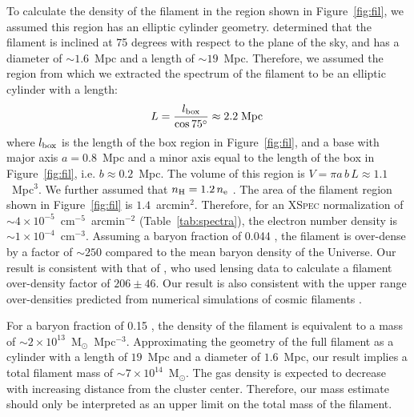 To calculate the density of the filament in the region shown in Figure~\ref{fig:fil}, we assumed this region has an elliptic cylinder geometry. \citet{Jauzac2012} determined that the filament is inclined at 75 degrees with respect to the plane of the sky, and has a diameter of $\sim 1.6$~Mpc and a length of $\sim 19$~Mpc. Therefore, we assumed the region from which we extracted the spectrum of the filament to be an elliptic cylinder with a length:
\begin{equation}
	L = \frac{l_{\rm box}}{\cos{75^{\circ}}} \approx 2.2 \; {\rm Mpc}\, 
\end{equation}
where $l_{\rm box}$ is the length of the box region in Figure~\ref{fig:fil}, and a base with major axis $a = 0.8$~Mpc and a minor axis equal to the length of the box in Figure~\ref{fig:fil}, i.e. $b \approx 0.2$~Mpc. The volume of this region is $V = \pi a\, b \, L \approx 1.1$~Mpc$^3$. We further assumed that $n_{\rm H} = 1.2 \, n_{\rm e}$ \citep{Bohringer2010}. The area of the filament region shown in Figure~\ref{fig:fil} is $1.4$~arcmin$^2$. Therefore, for an \textsc{XSpec} normalization of $\sim 4\times 10^{-5}$~cm$^{-5}$~arcmin${^{-2}}$ (Table~\ref{tab:spectra}), the electron number density is $\sim 1\times 10^{-4}$~cm$^{-3}$. Assuming a baryon fraction of 0.044 \citep{Kirkman2003}, the filament is over-dense by a factor of $\sim 250$ compared to the mean baryon density of the Universe. Our result is consistent with that of \citet{Jauzac2012}, who used lensing data to calculate a filament over-density factor of $206 \pm 46$. Our result is also consistent with the upper range over-densities predicted from numerical simulations of cosmic filaments \citep[e.g.,][]{Gheller2015}.

For a baryon fraction of 0.15 \citep{Mantz2014}, the density of the filament is equivalent to a mass of $\sim 2\times 10^{13}$~M$_{\odot}$~Mpc$^{-3}$.  Approximating the geometry of the full filament as a cylinder with a length of $19$~Mpc and a diameter of $1.6$~Mpc, our result implies a total filament mass of $\sim 7\times 10^{14}$~M$_\odot$. The gas density is expected to decrease with increasing distance from the cluster center. Therefore, our mass estimate should only be interpreted as an upper limit on the total mass of the filament.





